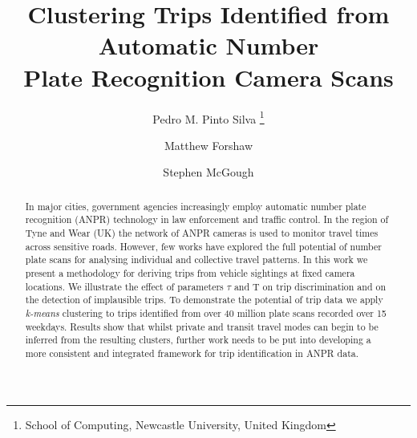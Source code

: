 \documentclass[twoside,leqno,twocolumn]{article}
\newcommand{\Tau}{\mathrm{T}}
\begin{document}

\title{\Large Clustering Trips Identified from Automatic Number \\ Plate Recognition Camera Scans}
\author{Pedro M. Pinto Silva \thanks{School of Computing, Newcastle University, United Kingdom}
\and
Matthew Forshaw\footnotemark[1]
\and
Stephen McGough\footnotemark[1]}
\date{}

\maketitle








\begin{abstract} \small\baselineskip=9pt In major cities, government agencies increasingly employ automatic number plate recognition (ANPR) technology in law enforcement and traffic control. In the region of Tyne and Wear (UK) the network of ANPR cameras is used to monitor travel times across sensitive roads. However, few works have explored the full potential of number plate scans for analysing individual and collective travel patterns. In this work we present a methodology for deriving trips from vehicle sightings at fixed camera locations. We illustrate the effect of parameters $\tau$ and $\Tau$ on trip discrimination and on the detection of implausible trips. To demonstrate the potential of trip data we apply \emph{k-means} clustering to trips identified from over 40 million plate scans recorded over 15 weekdays. Results show that whilst private and transit travel modes can begin to be inferred from the resulting clusters, further work needs to be put into developing a more consistent and integrated framework for trip identification in ANPR data.\end{abstract}
\end{document}
